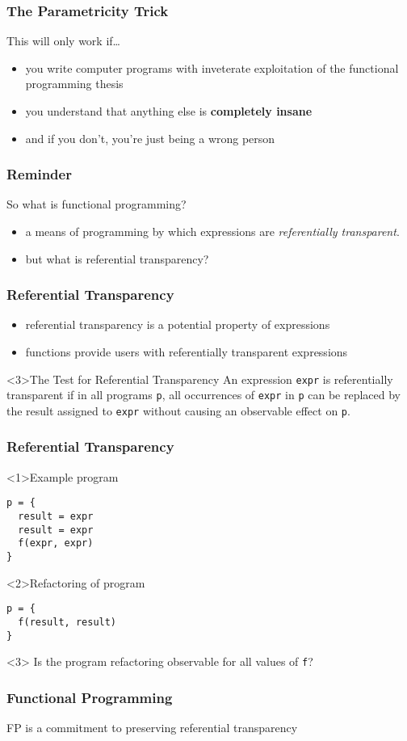 \begin{frame}[fragile]
\frametitle{The Parametricity Trick}
\begin{block}{This will only work if\ldots}
\begin{itemize}
\item<1-> you write computer programs with inveterate exploitation of the functional programming thesis
\item<1-> you understand that anything else is \textbf{completely insane}
\item<2-> and if you don't, you're just being a wrong person
\end{itemize}
\end{block}
\end{frame}

\begin{frame}[fragile]
\frametitle{Reminder}
\begin{block}{So what is functional programming?}
\begin{itemize}
\item<1-> a means of programming by which expressions are \emph{referentially transparent}.
\item<2-> but what is referential transparency?
\end{itemize}
\end{block}
\end{frame}

\begin{frame}
\frametitle{Referential Transparency}
\begin{itemize}
  \item<1> referential transparency is a potential property of expressions
  \item<2> functions provide users with referentially transparent expressions
\end{itemize}
\begin{block}<3>{The Test for Referential Transparency}
An expression \lstinline$expr$ is referentially transparent if in all programs \lstinline$p$, all occurrences of \lstinline$expr$ in \lstinline$p$ can be replaced by the result assigned to \lstinline$expr$ without causing an observable effect on \lstinline$p$.
\end{block}
\end{frame}

\begin{frame}[fragile]
\frametitle{Referential Transparency}
\begin{block}<1>{Example program}
\begin{lstlisting}
p = {
  result = expr
  result = expr
  f(expr, expr)
}
\end{lstlisting}
\end{block}
\begin{block}<2>{Refactoring of program}
\begin{lstlisting}
p = {
  f(result, result)
}
\end{lstlisting}
\end{block}
\begin{block}<3>{}
Is the program refactoring observable for all values of \lstinline$f$?
\end{block}
\end{frame}

\begin{frame}[fragile]
\frametitle{Functional Programming}
\begin{center}
FP is a commitment to preserving referential transparency
\end{center}
\end{frame}
